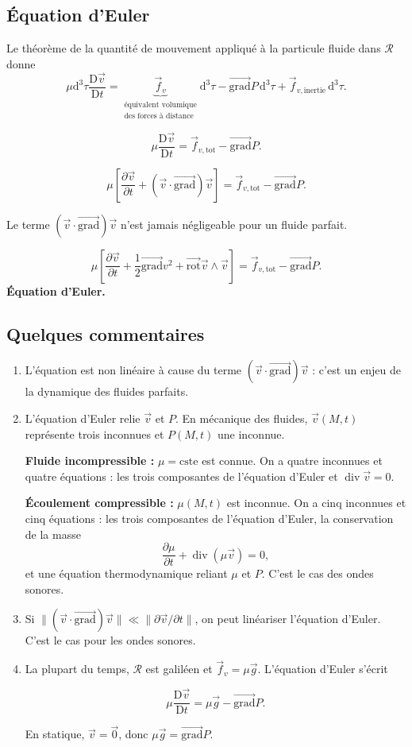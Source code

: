 \documentclass[11pt,a4paper]{article}
\newcommand{\dd}{\mathrm d}
\newcommand{\grad}{\overrightarrow{\mathrm{grad}}}
\newcommand{\pd}[2]{\frac{\partial #1}{\partial #2}}
\newcommand{\cste}{\mathrm{cste}}
\newcommand{\etoiles}[1]{\foreach \i in {1,...,#1}{\mathord{\star}\,}}
\newcommand{\R}{\mathcal R}
\newcommand{\Dv}{\frac{\mathrm D\vec v}{\mathrm Dt}}
\newcommand{\conv}{(\vec v\cdot\grad)\vec v}
\newcommand{\fv}{\vec f_v}\newcommand{\fvt}{\vec f_{v,\mathrm{tot}}}\newcommand{\fvi}{\vec f_{v,\mathrm{inertie}}}
\newcommand{\diver}{\operatorname{div}}
\newcommand{\rot}{\overrightarrow{\mathrm{rot}}}
\begin{document}
\subsection{Équation d'Euler}
\begin{center}\end{center}
Le théorème de la quantité de mouvement appliqué à la particule fluide dans $\R$ donne
\[\mu\dd^3\tau\Dv=\underbrace{\fv}_{\substack{\text{équivalent volumique}\\\text{des forces à distance}}}\dd^3\tau-\grad P\,\dd^3\tau+\fvi\,\dd^3\tau.\]
\begin{cadre}[etoiles={\etoiles{5}}]\[\mu\Dv=\fvt-\grad P.\]\end{cadre}
\begin{cadre}[etoiles={\etoiles{5}}]\[\mu\left[\pd{\vec v}t+\conv\right]=\fvt-\grad P.\]\end{cadre}
Le terme $(\vec v\cdot\grad)\vec v$ n'est jamais négligeable pour un fluide parfait.
\begin{cadre}[etoiles={\etoiles{6}}]\[\mu\left[\pd{\vec v}t+\frac12\grad v^2+\rot\vec v\wedge\vec v\right]=\fvt-\grad P.\]\textbf{Équation d'Euler.}\end{cadre}
\subsection{Quelques commentaires}
\begin{enumerate}
\item L'équation est non linéaire à cause du terme $(\vec v\cdot\grad)\vec v$ : c'est un enjeu de la dynamique des fluides parfaits.
\item L'équation d'Euler relie $\vec v$ et $P$. En mécanique des fluides, $\vec v(M,t)$ représente trois inconnues et $P(M,t)$ une inconnue.

\textbf{Fluide incompressible :} $\mu=\cste$ est connue. On a quatre inconnues et quatre équations : les trois composantes de l'équation d'Euler et $\diver\vec v=0$.

\textbf{Écoulement compressible :} $\mu(M,t)$ est inconnue. On a cinq inconnues et cinq équations : les trois composantes de l'équation d'Euler, la conservation de la masse
\[\pd\mu t+\diver(\mu\vec v)=0,\]
et une équation thermodynamique reliant $\mu$ et $P$. C'est le cas des ondes sonores.
\item Si $\|\conv\|\ll\|\partial\vec v/\partial t\|$, on peut linéariser l'équation d'Euler. C'est le cas pour les ondes sonores.
\item La plupart du temps, $\R$ est galiléen et $\fv=\mu\vec g$. L'équation d'Euler s'écrit
\begin{cadre}\[\mu\Dv=\mu\vec g-\grad P.\]\end{cadre}
En statique, $\vec v=\vec0$, donc $\mu\vec g=\grad P$.
\end{enumerate}
\end{document}
